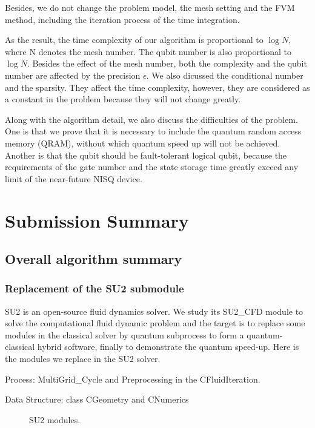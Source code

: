 \documentclass[%
 reprint,
 amsmath,amssymb,
pra,
]{revtex4-1}
\begin{document}
Besides, we do not change the problem model, the mesh setting and the FVM method, including the iteration process of the time integration.

As the result, the time complexity of our algorithm is proportional to $\log⁡ N$, where N denotes the mesh number. The qubit number is also proportional to $\log⁡ N$. Besides the effect of the mesh number, both the complexity and the qubit number are affected by the precision $\epsilon$. We also dicussed the conditional number and the sparsity. They affect the time complexity, however, they are considered as a constant in the problem because they will not change greatly.

Along with the algorithm detail, we also discuss the difficulties of the problem. One is that we prove that it is necessary to include the quantum random access memory (QRAM), without which quantum speed up will not be achieved. Another is that the qubit should be fault-tolerant logical qubit, because the requirements of the gate number and the state storage time greatly exceed any limit of the near-future NISQ device.

\section{Submission Summary}

\subsection{Overall algorithm summary}

\subsubsection{Replacement of the SU2 submodule}

SU2 is an open-source fluid dynamics solver. We study its SU2\_CFD module to solve the computational fluid dynamic problem and the target is to replace some modules in the classical solver by quantum subprocess to form a quantum-classical hybrid software, finally to demonstrate the quantum speed-up. Here is the modules we replace in the SU2 solver.

Process: MultiGrid\_Cycle and Preprocessing in the CFluidIteration.

Data Structure: class CGeometry and CNumerics

\begin{figure}[htbp]
     \caption{SU2 modules.}
    \label{SU2modules}
\end{figure}
\end{document}
